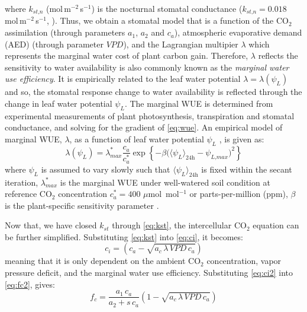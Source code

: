 where $k_{\textit{st,n}}$ (mol\,m$^{-2}$\,s$^{-1}$) is the nocturnal stomatal conductance ($k_{\textit{st,n}} = 0.018$ mol\,m$^{-2}$\,s$^{-1}$, \citep{Manoli2014}). Thus, we obtain a stomatal model that is a function of the CO$_2$ assimilation (through parameters $a_1$, $a_2$ and $c_a$), atmospheric evaporative demand (AED) (through parameter $\textit{VPD}$), and the Lagrangian multipier $\lambda$ which represents the marginal water cost of plant carbon gain. Therefore, $\lambda$ reflects the sensitivity to water availability is also commonly known as the \textit{marginal water use efficiency}. It is empirically related to the leaf water potential $\lambda = \lambda(\psi_L)$ \citep{Manoli2014,Katul2010} and so, the stomatal response change to water availability is reflected through the change in leaf water potential $\psi_L$. The marginal WUE is determined from experimental measurements of plant photosynthesis, transpiration and stomatal conductance, and solving for the gradient of 
\cref{eq:wue}. An empirical model of marginal WUE, $\lambda$, as a function of leaf water potential $\psi_L$ \citep{Manoli2014,Katul2010}, is given as:
\begin{equation}
\lambda \left(\psi_L\right) = \lambda_{\textit{max}}^* \frac{c_a}{c_a^*}\exp \left\{-\beta \Big( \langle \psi_L \rangle_{\textit{24h}} - \psi_{\textit{L,max}}\Big)^2\right\}
\label{eq:mwue}
\end{equation}
where $\psi_L$ is assumed to vary slowly such that $\langle \psi_L \rangle_{\textit{24h}}$ is fixed within the secant iteration, $\lambda_{max}^*$ is the marginal WUE under well-watered soil condition at reference CO$_2$ concentration $c_a^*=400$ $\mu$mol~mol$^{-1}$ or parts-per-million (ppm), $\beta$ is the plant-specific sensitivity parameter \citep{Huang2017}.

Now that, we have closed $k_{\textit{st}}$ through \cref{eq:kst}, the intercellular CO$_2$ equation can be further simplified. Substituting \cref{eq:kst} into \cref{eq:ci}, it becomes:
\begin{equation}
c_i = \left(c_a - \sqrt{a_c\,\lambda\, \textit{VPD}\, c_a} \right)
\label{eq:ci2}
\end{equation}
meaning that it is only dependent on the ambient CO$_2$ concentration, vapor pressure deficit, and the marginal water use efficiency. Substituting \cref{eq:ci2} into \cref{eq:fc2}, gives:
\begin{equation}
f_c = \frac{a_1\,c_a}{a_2 + s\,c_a}\left(1-\sqrt{a_c\, \lambda\, \textit{VPD}\, c_a}\right)
\end{equation} 

